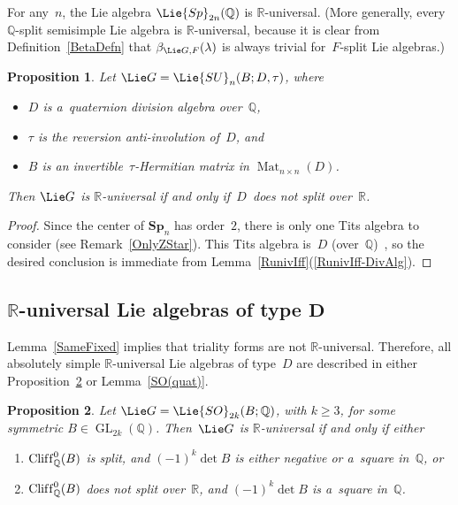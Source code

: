 \documentclass[pdftex]{sigma}
\DeclareMathOperator{\Cliff}{Clif\/f}
\DeclareMathOperator{\GL}{GL}
\DeclareMathOperator{\Mat}{Mat}
\numberwithin{equation}{section}
\newtheorem{prop}{Proposition}[section]
\begin{document}
\begin{eg}
For any~$n$, the Lie algebra $\Lie{Sp}_{2n}(\mathbb{Q})$ is $\mathbb{R}$-universal.
(More generally, every $\mathbb{Q}$-split semisimple Lie algebra is $\mathbb{R}$-universal, because it is clear from
Def\/inition~\ref{BetaDefn} that $\beta_{\Lie G, F}(\lambda)$ is always trivial for~$F$-split Lie algebras.)
\end{eg}

\begin{prop}
Let $\Lie G = \Lie{SU}_n(B; D, \tau)$, where
\begin{itemize}\itemsep=0pt
\item $D$ is a~quaternion division algebra over~$\mathbb{Q}$,
\item $\tau$ is the reversion anti-involution of~$D$, and
\item $B$ is an invertible~$\tau$-Hermitian matrix in $\Mat_{n\times n}(D)$.
\end{itemize}
Then $\Lie G$ is $\mathbb{R}$-universal if and only if~$D$~does not split over~$\mathbb{R}$.
\end{prop}

\begin{proof}
Since the center of $\mathbf{Sp}_n$ has order~$2$, there is only one Tits algebra to consider (see Remark~\ref{OnlyZStar}).
This Tits algebra is~$D$ (over~$\mathbb{Q}$)~\cite[p.~378]{KnusEtAl-BookOfInvols}, so the desired conclusion is
immediate from Lemma~\ref{RunivIff}(\ref{RunivIff-DivAlg}).
\end{proof}

\subsection[$\mathbb{R}$-universal Lie algebras of type $D$]{$\boldsymbol{\mathbb{R}}$-universal Lie algebras of type $\boldsymbol{D}$}\label{TypeD}

Lemma~\ref{SameFixed} implies that triality forms are not $\mathbb{R}$-universal.
Therefore, all absolutely simple $\mathbb{R}$-universal Lie algebras of type~$D$ are described in either Proposition~\ref{so2k} or
Lemma~\ref{SO(quat)}.

\begin{prop}
\label{so2k}
Let $\Lie G = \Lie{SO}_{2k}(B; \mathbb{Q})$, with $k \ge 3$, for some symmetric $B \in \GL_{2k}(\mathbb{Q})$.
Then~$\Lie G$ is $\mathbb{R}$-universal if and only if either
\renewcommand{\labelenumi}{{\rm (\theenumi)}}
\begin{enumerate}\itemsep=0pt
\item $\Cliff^0_\mathbb{Q}(B)$ is split, and $(-1)^k \det B$ is either negative or a~square in~$\mathbb{Q}$, or
\item $\Cliff^0_\mathbb{Q}(B)$ does not split over~$\mathbb{R}$, and $(-1)^k \det B$ is a~square in~$\mathbb{Q}$.
\end{enumerate}
\end{prop}
\end{document}
